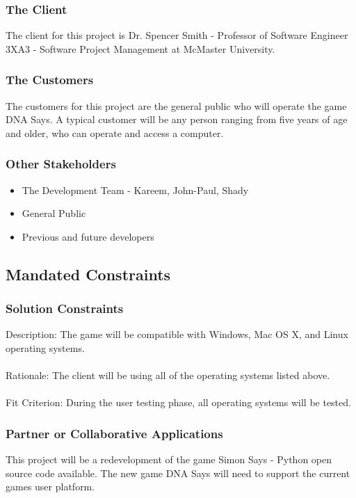 \documentclass[12pt, titlepage]{article}
\begin{document}
\subsubsection{The Client}
The client for this project is Dr. Spencer Smith - Professor of Software Engineer 3XA3 - Software Project Management at McMaster University.

\subsubsection{The Customers}
The customers for this project are the general public who will operate the game DNA Says. A typical customer will be any person ranging from five years of age and older, who can operate and access a computer. 

\subsubsection{Other Stakeholders}
\begin{itemize}
\item The Development Team - Kareem, John-Paul, Shady
\item General Public
\item Previous and future developers
\end{itemize}

\subsection{Mandated Constraints}

\subsubsection{Solution Constraints}
Description: The game will be compatible with Windows, Mac OS X, and Linux operating systems.\\
\\
Rationale: The client will be using all of the operating systems listed above.\\
\\
Fit Criterion: During the user testing phase, all operating systems will be tested.

\subsubsection{Partner or Collaborative Applications}
This project will be a redevelopment of the game Simon Says - Python open source code available. The new game DNA Says will need to support the current games user platform.
\end{document}
